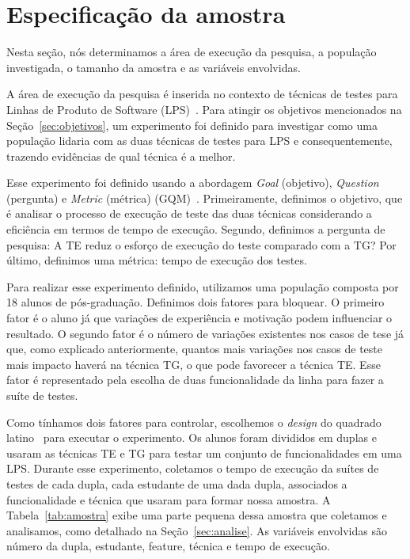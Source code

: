 \section{Especifica\c{c}\~ao da amostra}
\label{sec:especificacao}


Nesta seção, nós determinamos a área de execução da pesquisa, a população investigada, o tamanho da amostra e as variáveis envolvidas.

A área de execução da pesquisa é inserida no contexto de técnicas de testes para Linhas de Produto de Software (LPS)~\cite{pohl-book}. Para atingir os objetivos mencionados na Seção~\ref{sec:objetivos}, um experimento foi definido para investigar como uma população lidaria com as duas técnicas de testes para LPS e consequentemente, trazendo evidências de qual técnica é a melhor.

Esse experimento foi definido usando a abordagem \emph{Goal} (objetivo),
\emph{Question} (pergunta) e \emph{Metric} (métrica) (GQM)~\cite{gqm}.
Primeiramente, definimos o objetivo, que é analisar o processo de execução de
teste das duas técnicas considerando a eficiência em termos de tempo de
execução. Segundo, definimos a pergunta de pesquisa: A TE reduz o esforço de
execução do teste comparado com a TG? Por último, definimos uma métrica: tempo
de execução dos testes.

Para realizar esse experimento definido, utilizamos uma população composta por
18 alunos de pós-graduação. Definimos dois fatores para bloquear. O primeiro
fator é o aluno já que variações de experiência e motivação podem
influenciar o resultado. O segundo fator é o número de variações existentes
nos casos de tese já que, como explicado anteriormente, quantos mais variações
nos casos de teste mais impacto haverá na técnica TG, o que pode favorecer a
técnica TE. Esse fator é representado pela escolha de duas funcionalidade da
linha para fazer a suíte de testes.

Como tínhamos dois fatores para controlar, escolhemos o \emph{design}
do quadrado latino~\cite{citeulike:2905018} para executar o experimento. Os alunos
foram divididos em duplas e usaram as técnicas TE e TG para testar um conjunto de funcionalidades em uma
LPS. Durante esse experimento, coletamos o tempo de execução da suítes de
testes de cada dupla, cada estudante de uma dada dupla, associados a
funcionalidade e técnica que usaram para formar nossa amostra. A
Tabela~\ref{tab:amostra} exibe uma parte pequena dessa amostra que coletamos e analisamos, como
detalhado na Seção~\ref{sec:analise}. As variáveis envolvidas são número da
dupla, estudante, feature, técnica e tempo de execução.

